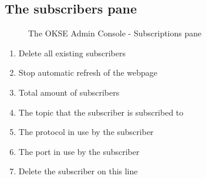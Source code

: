 \clearpage

\subsection{The subscribers pane}
\begin{center}
  \begin{figure}[ht!]
    \caption{The OKSE Admin Console - Subscriptions pane} 
    \label{fig:OKSE Admin Console - Subscriptions pane}
  \end{figure}
\end{center}
\begin{enumerate}
\item Delete all existing subscribers
\item Stop automatic refresh of the webpage
\item Total amount of subscribers
\item The topic that the subscriber is subscribed to
\item The protocol in use by the subscriber
\item The port in use by the subscriber
\item Delete the subscriber on this line
\end{enumerate}

\clearpage


